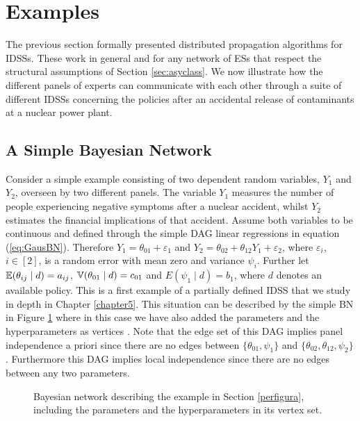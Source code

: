 \section{Examples}
\label{sec:exalgo}
The previous section formally presented distributed propagation algorithms for IDSSs. These work in general and for any network of ESs that respect the structural assumptions of Section \ref{sec:asyclass}.  We now illustrate how the different  panels of experts can communicate with each other through a suite of different IDSSs concerning the policies after an accidental release of contaminants at a nuclear power plant. 

\subsection{A Simple Bayesian Network}
Consider a simple example consisting of two dependent random variables, $Y_1$ and $Y_2$, overseen by two different panels. The variable $Y_1$ measures the number of people experiencing negative symptoms after a nuclear accident, whilst $Y_2$ estimates the financial implications  of that accident. Assume both variables to be continuous and defined through the simple DAG linear regressions in equation (\ref{eq:GausBN}). Therefore $Y_1=\theta_{01}+\varepsilon_1$ and $Y_2=\theta_{02}+\theta_{12}Y_1+\varepsilon_2$, where $\varepsilon_i$, $i\in[2]$, is a random error with mean zero and variance $\psi_i$. Further let $\mathbb{E}(\theta_{ij}\;|\;d)=a_{ij}$, $\mathbb{V}(\theta_{01}\;|\;d)=c_{01}$ and $E(\psi_1\;|\;d)=b_1$, where $d$ denotes an available policy. This is a first example of a partially defined IDSS that we study in depth in Chapter \ref{chapter5}.  This situation can be described by the simple BN in Figure \ref{fig:simpleBNex} where in this case we have also added the parameters and the hyperparameters as vertices \citep[this is often done in practice, as discussed in][]{O'Hagan2004a}. Note that the edge set of this DAG implies panel independence a priori since there are no edges between $\{\theta_{01},\psi_{1}\}$ and $\{\theta_{02},\theta_{12},\psi_2\}$. Furthermore this DAG implies local independence since there are no edges between any two parameters. 

\begin{figure}
\centerline{
}
\caption{Bayesian network describing the example in Section \ref{perfigura}, including the parameters and the hyperparameters in its vertex set. \label{fig:simpleBNex}}
\end{figure}

